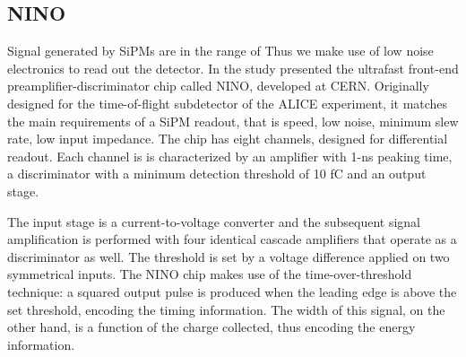 \subsection{NINO}
Signal generated by SiPMs are in the range of  
Thus we make use of low noise electronics to read out the detector. In the study presented the ultrafast front-end preamplifier-discriminator chip called NINO, developed at CERN\cite{Anghinolfi2004}. Originally designed for the time-of-flight subdetector of the ALICE experiment, it matches the main requirements of a SiPM readout, that is speed, low noise, minimum slew rate, low input impedance.
The chip has eight channels, designed for differential readout. Each channel is is characterized by an amplifier with 1-ns peaking time, a discriminator with a minimum detection threshold of 10 fC and an output stage.


The input stage is a current-to-voltage converter and the subsequent signal amplification is performed with four identical cascade amplifiers that operate as a discriminator as well.
The threshold is set by a voltage difference applied on two symmetrical inputs.
The NINO chip makes use of the time-over-threshold technique: a squared output pulse is produced when the leading edge is above the set threshold, encoding the timing information. The width of this signal, on the other hand, is a function of the charge collected, thus encoding the energy information. 


